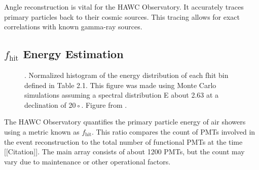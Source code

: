 Angle reconstruction is vital for the HAWC Observatory. It accurately traces primary particles back to their cosmic sources. This tracing allows for exact correlations with known gamma-ray sources.

\subsection{$f_\mathrm{hit}$ Energy Estimation}

\begin{figure}
    \caption{. Normalized histogram of the energy distribution of each fhit bin defined in Table 2.1. This figure was made using Monte Carlo simulations assuming a spectral distribution E about 2.63 at a declination of 20◦. Figure from \cite{Abeysekara_2017}.}
    \label{fig:fhit_bins}
\end{figure}



The HAWC Observatory quantifies the primary particle energy of air showers using a metric known as $f_{\text{hit}}$.
This ratio compares the count of PMTs involved in the event reconstruction to the total number of functional PMTs at the time [[Citation]].
The main array consists of about 1200 PMTs, but the count may vary due to maintenance or other operational factors.

